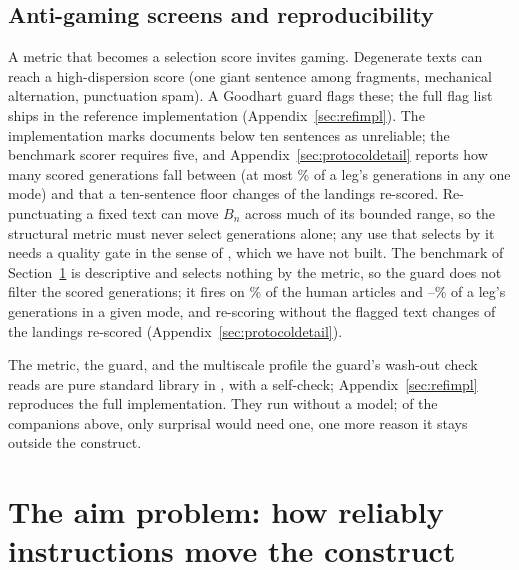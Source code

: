 \documentclass{article}
\begin{document}
\subsection{Anti-gaming screens and reproducibility}
A metric that becomes a selection score invites gaming. Degenerate texts can reach a
high-dispersion score (one giant sentence among fragments, mechanical alternation, punctuation spam).
A Goodhart guard flags these; the full flag list ships in the reference implementation
(Appendix~\ref{sec:refimpl}). The implementation marks documents below ten sentences as
unreliable; the benchmark scorer requires five, and Appendix~\ref{sec:protocoldetail} reports how
many scored generations fall between (at most \% of a leg's generations in
any one mode) and that a ten-sentence floor changes  of the
 landings re-scored.
Re-punctuating a fixed text can move $B_n$ across much of its bounded range, so the structural
metric must never select generations alone; any use that selects by it needs a quality gate in
the sense of \citet{arxiv2025evaluating}, which we have not built. The benchmark of
Section~\ref{sec:promptceiling} is descriptive and selects nothing by the metric, so the guard does
not filter the scored generations; it fires on \% of the human articles and
--\% of a leg's generations in a given mode, and
re-scoring without the flagged text changes  of the  landings
re-scored (Appendix~\ref{sec:protocoldetail}).

The metric, the guard, and the multiscale profile the guard's wash-out check reads are pure standard library in
, with a self-check; Appendix~\ref{sec:refimpl} reproduces the full implementation. They run without a model; of the
companions above, only surprisal would need one, one more reason it stays
outside the construct.

\section{The aim problem: how reliably instructions move the construct}
\label{sec:promptceiling}
\end{document}
